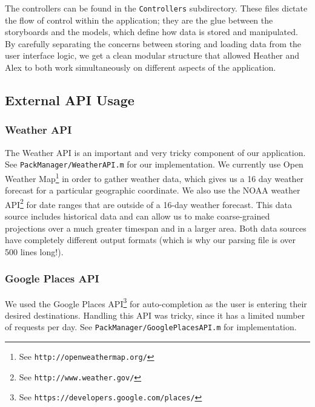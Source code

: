 \documentclass[11pt]{article}
\begin{document}
    The controllers can be found in the \texttt{Controllers} subdirectory. These files dictate the flow of control within the application; they are the glue between the storyboards and the models, which define how data is stored and manipulated. By carefully separating the concerns between storing and loading data from the user interface logic, we get a clean modular structure that allowed Heather and Alex to both work simultaneously on different aspects of the application. 



    \subsection{External API Usage}
    \subsubsection{Weather API}
    The Weather API is an important and very tricky component of our application. See \texttt{PackManager/WeatherAPI.m} for our implementation. We currently use Open Weather Map\footnote{See \texttt{http://openweathermap.org/}} in order to gather weather data, which gives us a 16 day weather forecast for a particular geographic coordinate. We also use the NOAA weather API\footnote{See \texttt{http://www.weather.gov/}} for date ranges that are outside of a 16-day weather forecast. This data source includes historical data and can allow us to make coarse-grained projections over a much greater timespan and in a larger area. Both data sources have completely different output formats (which is why our parsing file is over 500 lines long!).

    \subsubsection{Google Places API}
    We used the Google Places API\footnote{See \texttt{https://developers.google.com/places/}} for auto-completion as the user is entering their desired destinations. Handling this API was tricky, since it has a limited number of requests per day. See \texttt{PackManager/GooglePlacesAPI.m} for implementation.

\end{document}
